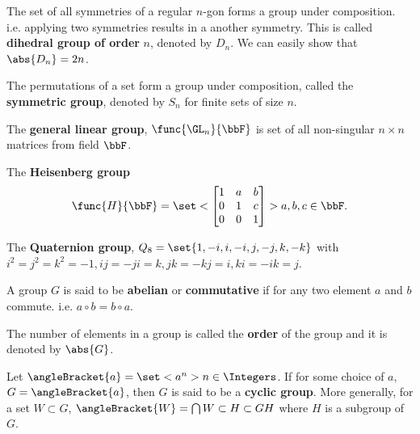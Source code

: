 \begin{example}
    The set of all symmetries of a regular \(n\)-gon forms a group under composition. i.e. applying two symmetries results in a another symmetry. This is called \textbf{dihedral group of order }\(n\), denoted by \(D_n\). We can easily show that \(\abs{D_n} = 2n\). 
\end{example}

\begin{example}
    The permutations of a set form a group under composition, called the \textbf{symmetric group}, denoted by \(S_n\) for finite sets of size \(n\).
\end{example}

\begin{example}
    The \textbf{general linear group}, \(\func{\GL_n}{\bbF}\) is set of all non-singular \(n\times n\) matrices from field \(\bbF\).
\end{example}

\begin{example}
    The \textbf{Heisenberg group}
    \begin{equation*}
        \func{H}{\bbF} = \set< \begin{bmatrix}
            1 & a & b \\
            0 & 1 &c \\
            0 & 0 & 1
        \end{bmatrix}> {a,b,c \in \bbF}.
    \end{equation*}
\end{example}

\begin{example}
    The \textbf{Quaternion group}, \(Q_8 = \set{1,-i,i,-i,j,-j,k,-k}\) with \(i^2 = j^2 = k^2 = -1, ij = -ji = k, jk =-kj = i, ki = -ik =j\).
\end{example}

\begin{definition}
    A group \(G\) is said to be \textbf{abelian} or \textbf{commutative} if for any two element \(a\) and \(b\) commute. i.e. \(a \circ b = b \circ a\).
\end{definition}

\begin{definition}
    The number of elements in a group is called the \textbf{order} of the group and it is denoted by \(\abs{G}\).
\end{definition}

\begin{definition}
    Let \(\angleBracket{a} = \set<a^n>{n \in \Integers}\). If for some choice of \(a\), \(G = \angleBracket{a}\), then \(G\) is said to be a \textbf{cyclic group}. More generally, for a set \(W \subset G\), \(\angleBracket{W} = \bigcap{W \subset H \subset G} H\) where \(H\) is a subgroup of \(G\).
\end{definition}

